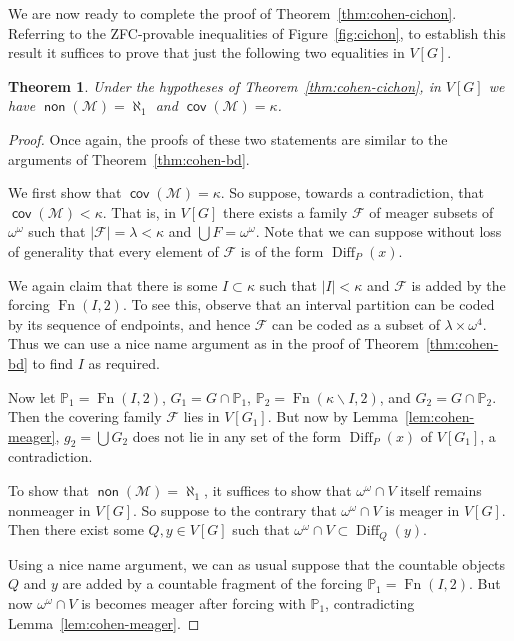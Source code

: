 \documentclass[11pt,oneside,a4paper]{amsbook}
\newcommand{\PP}{\mathbb P}
\newcommand{\Meager}{\mathcal M}
\DeclareMathOperator{\non}{\mathsf{non}}
\DeclareMathOperator{\cov}{\mathsf{cov}}
\DeclareMathOperator{\Diff}{Diff}
\DeclareMathOperator{\Fn}{Fn}
\theoremstyle{definition}
\theoremstyle{plain}
\newtheorem{theorem}{Theorem}[section]
\theoremstyle{definition}
\theoremstyle{remark}
\numberwithin{equation}{section}
\numberwithin{figure}{section}
\begin{document}
We are now ready to complete the proof of Theorem~\ref{thm:cohen-cichon}. Referring to the ZFC-provable inequalities of Figure~\ref{fig:cichon}, to establish this result it suffices to prove that just the following two equalities in $V[G]$.

\begin{theorem}
  \label{thm:cohen-meager}
  Under the hypotheses of Theorem~\ref{thm:cohen-cichon}, in $V[G]$ we have $\non(\Meager)=\aleph_1$ and $\cov(\Meager)=\kappa$.
\end{theorem}

\begin{proof}
 Once again, the proofs of these two statements are similar to the arguments of Theorem~\ref{thm:cohen-bd}.

  We first show that $\cov(\Meager)=\kappa$. So suppose, towards a contradiction, that $\cov(\Meager)<\kappa$. That is, in $V[G]$ there exists a family $\mathcal F$ of meager subsets of $\omega^\omega$ such that $|\mathcal F|=\lambda<\kappa$ and $\bigcup F=\omega^\omega$.  Note that we can suppose without loss of generality that every element of $\mathcal F$ is of the form $\Diff_P(x)$.

  We again claim that there is some $I\subset\kappa$ such that $|I|<\kappa$ and $\mathcal F$ is added by the forcing $\Fn(I,2)$. To see this, observe that an interval partition can be coded by its sequence of endpoints, and hence $\mathcal F$ can be coded as a subset of $\lambda\times\omega^4$. Thus we can use a nice name argument as in the proof of Theorem~\ref{thm:cohen-bd} to find $I$ as required.

  Now let $\PP_1=\Fn(I,2)$, $G_1=G\cap\PP_1$, $\PP_2=\Fn(\kappa\smallsetminus I,2)$, and $G_2=G\cap\PP_2$. Then the covering family $\mathcal F$ lies in $V[G_1]$. But now by Lemma~\ref{lem:cohen-meager}, $g_2=\bigcup G_2$ does not lie in any set of the form $\Diff_P(x)$ of $V[G_1]$, a contradiction.

  To show that $\non(\Meager)=\aleph_1$, it suffices to show that $\omega^\omega\cap V$ itself remains nonmeager in $V[G]$. So suppose to the contrary that $\omega^\omega\cap V$ is meager in $V[G]$. Then there exist some $Q,y\in V[G]$ such that $\omega^\omega\cap V\subset\Diff_Q(y)$.

  Using a nice name argument, we can as usual suppose that the countable objects $Q$ and $y$ are added by a countable fragment of the forcing $\PP_1=\Fn(I,2)$. But now $\omega^\omega\cap V$ is becomes meager after forcing with $\PP_1$, contradicting Lemma~\ref{lem:cohen-meager}.
\end{proof}
\end{document}
